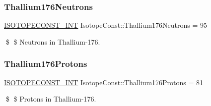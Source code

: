 \subsubsection{\texorpdfstring{Thallium176\+Neutrons}{Thallium176Neutrons}}
{\footnotesize\ttfamily \mbox{\hyperlink{group___isotope_const-_macros_ga5f18360b3e99483a35c32d789e62621c}{I\+S\+O\+T\+O\+P\+E\+C\+O\+N\+S\+T\+\_\+\+I\+NT}} Isotope\+Const\+::\+Thallium176\+Neutrons = 95}

\$ \$ Neutrons in Thallium-\/176. \mbox{\label{group___isotope_const-_thallium-_tl176_ga951f92364e7268391d9914934d87651a}} 
\subsubsection{\texorpdfstring{Thallium176\+Protons}{Thallium176Protons}}
{\footnotesize\ttfamily \mbox{\hyperlink{group___isotope_const-_macros_ga5f18360b3e99483a35c32d789e62621c}{I\+S\+O\+T\+O\+P\+E\+C\+O\+N\+S\+T\+\_\+\+I\+NT}} Isotope\+Const\+::\+Thallium176\+Protons = 81}

\$ \$ Protons in Thallium-\/176. 